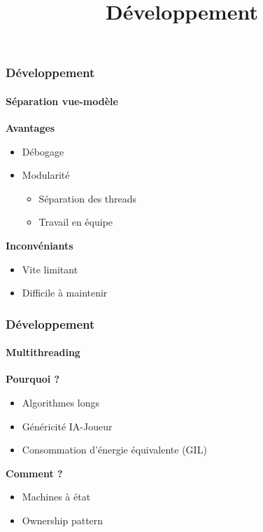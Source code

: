 \title{Développement}
\subtitle{}
\author{}
\institute{}
\date{}
\begin{frame}
	\maketitle
\end{frame}

\begin{frame}
	\frametitle{Développement}
	\framesubtitle{Séparation vue-modèle}
	\textbf{Avantages}
	\begin{itemize}
		\item Débogage
		\item Modularité
		\begin{itemize}
			\item Séparation des threads
			\item Travail en équipe
		\end{itemize}
	\end{itemize}

	\textbf{Inconvéniants}
	\begin{itemize}
		\item Vite limitant
		\item Difficile à maintenir
	\end{itemize}
\end{frame}

\begin{frame}
	\frametitle{Développement}
	\framesubtitle{Multithreading}

	\textbf{Pourquoi ?}
	\begin{itemize}
		\item Algorithmes longs
		\item Généricité IA-Joueur
		\item Consommation d'énergie équivalente (GIL)
	\end{itemize}
	\textbf{Comment ?}
	\begin{itemize}
		\item Machines à état
		\item Ownership pattern
	\end{itemize}
\end{frame}

